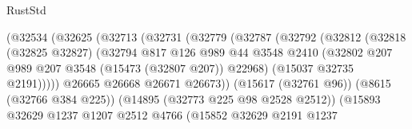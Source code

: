 \begin{lexlean}{RustStd}
\begin{coremodule}
                                        (@32534
                                          (@32625
                                            (@32713
                                              (@32731
                                                (@32779
                                                  (@32787
                                                    (@32792
                                                      (@32812
                                                        (@32818
                                                          (@32825 @32827)
                                                          (@32794
                                                            @817
                                                            @126
                                                            @989
                                                            @44
                                                            @3548
                                                            @2410
                                                            (@32802
                                                              @207
                                                              @989
                                                              @207
                                                              @3548
                                                              (@15473 (@32807 @207))
                                                              @22968)
                                                            (@15037 @32735 @2191)))))
                                                    @26665
                                                    @26668
                                                    @26671
                                                    @26673))
                                                (@15617 (@32761 @96))
                                                (@8615 (@32766 @384 @225))
                                                (@14895 (@32773 @225 @98 @2528 @2512))
                                                (@15893
                                                  @32629
                                                  @1237
                                                  @1207
                                                  @2512
                                                  @4766
                                                  (@15852
                                                    @32629
                                                    @2191
                                                    @1237

\end{coremodule}
\end{lexlean}
